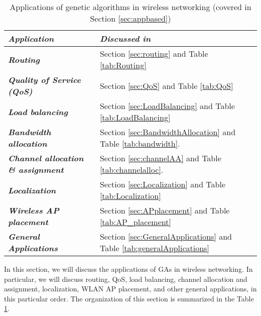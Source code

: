 \documentclass[journal]{IEEEtran}
\begin{document}
\begin{table}
\centering
\caption{Applications of genetic algorithms in wireless networking (covered in Section \ref{sec:appbased})}
\begin{tabular}{p{3cm}p{4cm}}
\toprule
 \textbf{\emph{Application}} &  \textbf{\emph{Discussed in}} \\
\midrule

\multicolumn{1}{l}{\textbf{\emph{Routing}}} &  Section \ref{sec:routing} and Table \ref{tab:Routing}\\

\multicolumn{1}{l}{\textbf{\emph{Quality of Service (QoS)}}}  &  Section \ref{sec:QoS} and Table \ref{tab:QoS}\\
 
 \multicolumn{1}{l}{\textbf{\emph{Load balancing}}}  &  Section \ref{sec:LoadBalancing} and Table \ref{tab:LoadBalancing}\\

 \multicolumn{1}{l}{\textbf{\emph{Bandwidth allocation}}} &Section \ref{sec:BandwidthAllocation} and Table \ref{tab:bandwidth}.\\

 \multicolumn{1}{l}{\textbf{\emph{Channel allocation \& assignment}}} &Section \ref{sec:channelAA} and Table \ref{tab:channelalloc}.\\
  
  \multicolumn{1}{l}{\textbf{\emph{Localization}}} & Section \ref{sec:Localization} and Table \ref{tab:Localization}\\
  
    \multicolumn{1}{l}{\textbf{\emph{Wireless AP placement}}} &  
    Section \ref{sec:APplacement}  and Table \ref{tab:AP_placement}
\\

    \multicolumn{1}{l}{\textbf{\emph{General Applications}}} &
    Section \ref{sec:GeneralApplications} and Table \ref{tab:generalApplications}
    \\

\bottomrule 
\end{tabular}
\label{tab:summary}

\end{table}

In this section, we will discuss the applications of GAs in wireless networking. In particular, we will discuss routing, QoS, load balancing, channel allocation and assignment, localization, WLAN AP placement, and other general applications, in this particular order. The organization of this section is summarized in the Table \ref{tab:summary}.
\end{document}
